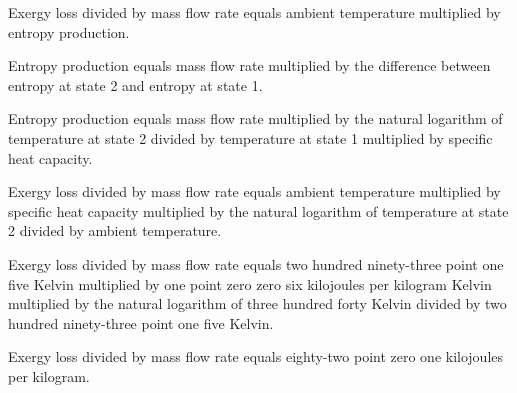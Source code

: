 Exergy loss divided by mass flow rate equals ambient temperature multiplied by entropy production.  

Entropy production equals mass flow rate multiplied by the difference between entropy at state 2 and entropy at state 1.  

Entropy production equals mass flow rate multiplied by the natural logarithm of temperature at state 2 divided by temperature at state 1 multiplied by specific heat capacity.  

Exergy loss divided by mass flow rate equals ambient temperature multiplied by specific heat capacity multiplied by the natural logarithm of temperature at state 2 divided by ambient temperature.  

Exergy loss divided by mass flow rate equals two hundred ninety-three point one five Kelvin multiplied by one point zero zero six kilojoules per kilogram Kelvin multiplied by the natural logarithm of three hundred forty Kelvin divided by two hundred ninety-three point one five Kelvin.  

Exergy loss divided by mass flow rate equals eighty-two point zero one kilojoules per kilogram.